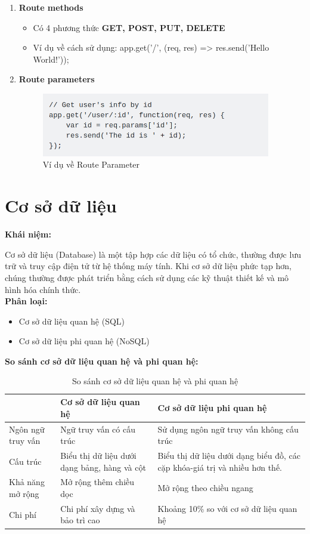 \begin{enumerate}
\begin{enumerate}
        \item \textbf{Route methods}
        \begin{itemize}
            \item Có 4 phương thức \textbf{GET, POST, PUT, DELETE}
            \item Ví dụ về cách sử dụng: app.get('/', (req, res) => res.send('Hello World!'));
        \end{itemize}
        \item \textbf{Route parameters}
        \begin{figure}[H]
        \centering
        \includegraphics[width = 10cm]{image/route-parameter.png}
        \caption{Ví dụ về Route Parameter}
        \label{fig:route_parameter}
    \end{figure}
    \end{enumerate}
\end{enumerate}

\newpage
\section{Cơ sở dữ liệu}
\textbf{Khái niệm:}

Cơ sở dữ liệu (Database) là một tập hợp các dữ liệu có tổ chức, thường được lưu trữ và truy cập điện tử từ hệ thống máy tính. Khi cơ sở dữ liệu phức tạp hơn, chúng thường được phát triển bằng cách sử dụng các kỹ thuật thiết kế và mô hình hóa chính thức.\\

\textbf{Phân loại:}
\begin{itemize}
    \item Cơ sở dữ liệu quan hệ (SQL)
    \item Cơ sở dữ liệu phi quan hệ (NoSQL)
\end{itemize}

\textbf{So sánh cơ sở dữ liệu quan hệ và phi quan hệ:}
\begin{table}[H]
	    \centering
	    \begin{tabular}{|p{3cm}|p{6cm}|p{6cm}|}
	    \hline
	    &Cơ sở dữ liệu quan hệ&Cơ sở dữ liệu phi quan hệ\\
	    \hline
	    Ngôn ngữ truy vấn&Ngữ truy vấn có cấu trúc&Sử dụng ngôn ngữ truy vấn không cấu trúc\\
	    \hline
	    Cấu trúc&Biểu thị dữ liệu dưới dạng bảng, hàng và cột&Biểu thị dữ liệu dưới dạng biểu đồ, các cặp khóa-giá trị và nhiều hơn thế.\\
	    \hline
	    Khả năng mở rộng&Mở rộng thêm chiều dọc&Mở rộng theo chiều ngang\\
	    \hline
	    Chi phí&Chi phí xây dựng và bảo trì cao&Khoảng 10\% so với cơ sở dữ liệu quan hệ\\
	    \hline
	    \end{tabular}
	    \caption{So sánh cơ sở dữ liệu quan hệ và phi quan hệ}
\end{table}
